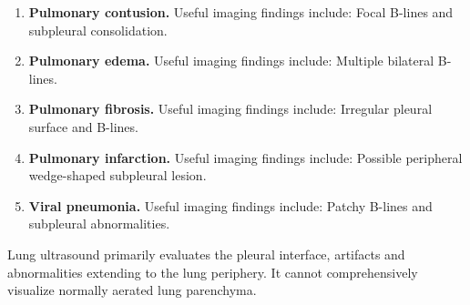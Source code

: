 \begin{enumerate}[leftmargin=*,itemsep=0.45em,topsep=0.4em]
\item \textbf{Pulmonary contusion.} Useful imaging findings include: Focal B-lines and subpleural consolidation.
\item \textbf{Pulmonary edema.} Useful imaging findings include: Multiple bilateral B-lines.
\item \textbf{Pulmonary fibrosis.} Useful imaging findings include: Irregular pleural surface and B-lines.
\item \textbf{Pulmonary infarction.} Useful imaging findings include: Possible peripheral wedge-shaped subpleural lesion.
\item \textbf{Viral pneumonia.} Useful imaging findings include: Patchy B-lines and subpleural abnormalities.
\end{enumerate}
Lung ultrasound primarily evaluates the pleural interface, artifacts and abnormalities extending to the lung periphery. It cannot comprehensively visualize normally aerated lung parenchyma.

